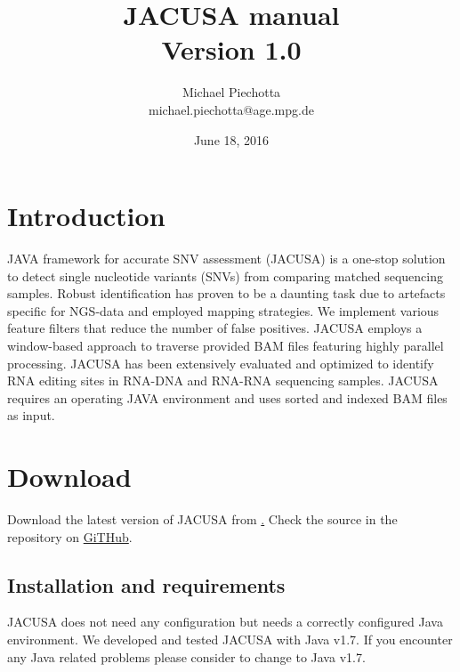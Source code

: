 \documentclass[10pt, a4paper]{article}
\title{JACUSA manual \\ Version 1.0}
\author{Michael Piechotta \\ michael.piechotta@age.mpg.de}
\date{June 18, 2016}
\begin{document}
\maketitle \tableofcontents
\section{Introduction}
JAVA framework for accurate SNV assessment (JACUSA) is a one-stop solution to detect single
nucleotide variants (SNVs) from comparing matched sequencing samples. Robust identification has
proven to be a daunting task due to artefacts specific for NGS-data and employed mapping
strategies. We implement various feature filters that reduce the number of false positives. JACUSA
employs a window-based approach to traverse provided BAM files featuring highly parallel processing.
JACUSA has been extensively evaluated and optimized to identify RNA editing sites in RNA-DNA and
RNA-RNA sequencing samples. JACUSA requires an operating JAVA environment and uses sorted and
indexed BAM files as input.
\section{Download}
Download the latest version of JACUSA from \href{https://github.com/dieterich-lab/JACUSA/blob/master/build/JACUSA_v1.0.0.jar}. 
Check the source in the repository on \href{https://github.com/dieterich-lab/JACUSA}{GiTHub}.
\subsection{Installation and requirements}
JACUSA does not need any configuration but needs a correctly configured Java environment.
We developed and tested JACUSA with Java v1.7. If you encounter any Java related problems please
consider to change to Java v1.7.
\end{document}
